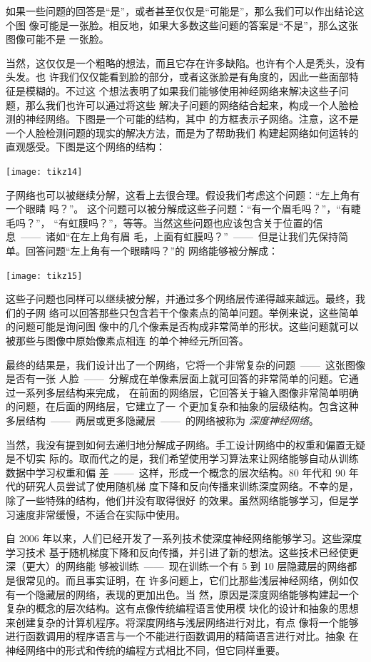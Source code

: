 如果一些问题的回答是“是”，或者甚至仅仅是“可能是”，那么我们可以作出结论这个图
像可能是一张脸。相反地，如果大多数这些问题的答案是“不是”，那么这张图像可能不是
一张脸。

当然，这仅仅是一个粗略的想法，而且它存在许多缺陷。也许有个人是秃头，没有头发。也
许我们仅仅能看到脸的部分，或者这张脸是有角度的，因此一些面部特征是模糊的。不过这
个想法表明了如果我们能够使用神经网络来解决这些子问题，那么我们也许可以通过将这些
解决子问题的网络结合起来，构成一个人脸检测的神经网络。下图是一个可能的结构，其中
的方框表示子网络。注意，这不是一个人脸检测问题的现实的解决方法，而是为了帮助我们
构建起网络如何运转的直观感受。下图是这个网络的结构：

\begin{center}
  \texttt{[image: tikz14]}
\end{center}

子网络也可以被继续分解，这看上去很合理。假设我们考虑这个问题：“左上角有一个眼睛
吗？”。 这个问题可以被分解成这些子问题：“有一个眉毛吗？”，“有睫毛吗？”，
“有虹膜吗？”，等等。当然这些问题也应该包含关于位置的信息~——~诸如“在左上角有眉
毛，上面有虹膜吗？”~——~但是让我们先保持简单。回答问题“左上角有一个眼睛吗？”的
网络能够被分解成：

\begin{center}
  \texttt{[image: tikz15]}
\end{center}

这些子问题也同样可以继续被分解，并通过多个网络层传递得越来越远。最终，我们的子网
络可以回答那些只包含若干个像素点的简单问题。举例来说，这些简单的问题可能是询问图
像中的几个像素是否构成非常简单的形状。这些问题就可以被那些与图像中原始像素点相连
的单个神经元所回答。

最终的结果是，我们设计出了一个网络，它将一个非常复杂的问题~——~这张图像是否有一张
人脸~——~分解成在单像素层面上就可回答的非常简单的问题。它通过一系列多层结构来完成，
在前面的网络层，它回答关于输入图像非常简单明确的问题，在后面的网络层，它建立了一
个更加复杂和抽象的层级结构。包含这种多层结构~——~两层或更多隐藏层~——~的网络被称为%
\emph{深度神经网络}。

当然，我没有提到如何去递归地分解成子网络。手工设计网络中的权重和偏置无疑是不切实
际的。取而代之的是，我们希望使用学习算法来让网络能够自动从训练数据中学习权重和偏
差~——~这样，形成一个概念的层次结构。80 年代和 90 年代的研究人员尝试了使用随机梯
度下降和反向传播来训练深度网络。不幸的是，除了一些特殊的结构，他们并没有取得很好
的效果。虽然网络能够学习，但是学习速度非常缓慢，不适合在实际中使用。

自 2006 年以来，人们已经开发了一系列技术使深度神经网络能够学习。这些深度学习技术
基于随机梯度下降和反向传播，并引进了新的想法。这些技术已经使更深（更大）的网络能
够被训练~——~现在训练一个有 5 到 10 层隐藏层的网络都是很常见的。而且事实证明，在
许多问题上，它们比那些浅层神经网络，例如仅有一个隐藏层的网络，表现的更加出色。当
然，原因是深度网络能够构建起一个复杂的概念的层次结构。这有点像传统编程语言使用模
块化的设计和抽象的思想来创建复杂的计算机程序。将深度网络与浅层网络进行对比，有点
像将一个能够进行函数调用的程序语言与一个不能进行函数调用的精简语言进行对比。抽象
在神经网络中的形式和传统的编程方式相比不同，但它同样重要。
